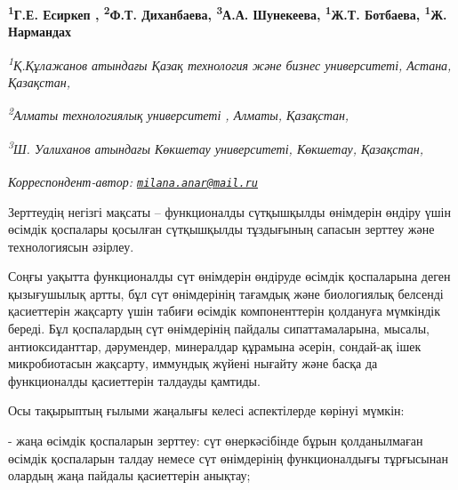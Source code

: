 
\begin{articleheader}

{\bfseries
\textsuperscript{1}Г.Е. Есиркеп\textsuperscript{\envelope } ,
\textsuperscript{2}Ф.Т. Диханбаева,
\textsuperscript{3}А.А. Шунекеева,
\textsuperscript{1}Ж.Т. Ботбаева,
\textsuperscript{1}Ж. Нармандах}
\end{articleheader}

\begin{affiliation}
\emph{\textsuperscript{1}Қ.Құлажанов атындағы Қазақ технология және бизнес университеті, Астана, Қазақстан,}

\emph{\textsuperscript{2}Алматы технологиялық университеті , Алматы, Қазақстан,}

\emph{\textsuperscript{3}Ш. Уалиханов атындағы Көкшетау университеті, Көкшетау, Қазақстан,}

\raggedright \textsuperscript{\envelope }{\em Корреспондент-автор: \href{mailto:milana.anar@mail.ru}{\nolinkurl{milana.anar@mail.ru}}}
\end{affiliation}

Зерттеудің негізгі мақсаты -- функционалды сүтқышқылды өнімдерін өндіру
үшін өсімдік қоспалары қосылған сүтқышқылды тұздығының сапасын зерттеу
және технологиясын әзірлеу.

Соңғы уақытта функционалды сүт өнімдерін өндіруде өсімдік қоспаларына
деген қызығушылық артты, бұл сүт өнімдерінің тағамдық және биологиялық
белсенді қасиеттерін жақсарту үшін табиғи өсімдік компоненттерін
қолдануға мүмкіндік береді. Бұл қоспалардың сүт өнімдерінің пайдалы
сипаттамаларына, мысалы, антиоксиданттар, дәрумендер, минералдар
құрамына әсерін, сондай-ақ ішек микробиотасын жақсарту, иммундық жүйені
нығайту және басқа да функционалды қасиеттерін талдауды қамтиды.

Осы тақырыптың ғылыми жаңалығы келесі аспектілерде көрінуі мүмкін:

- жаңа өсімдік қоспаларын зерттеу: сүт өнеркәсібінде бұрын қолданылмаған
өсімдік қоспаларын талдау немесе сүт өнімдерінің функционалдығы
тұрғысынан олардың жаңа пайдалы қасиеттерін анықтау;

